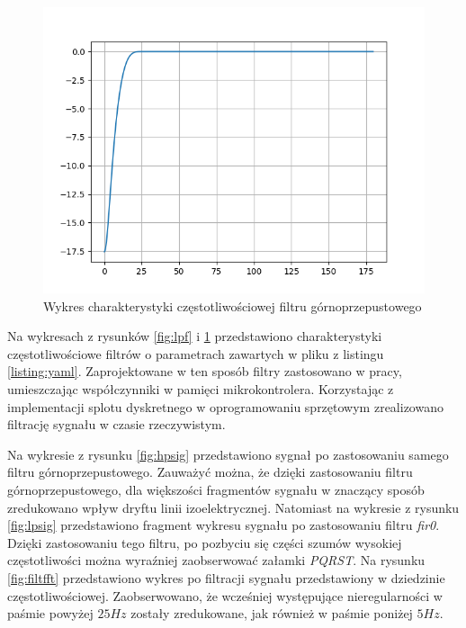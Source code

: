 \begin{figure}[h!]
    \centering 
    \includegraphics[scale=0.5]{pl/media/hpf.png}
    \caption{Wykres charakterystyki częstotliwościowej filtru górnoprzepustowego} 
    \label{fig:hpf}
\end{figure}

Na wykresach z rysunków
\ref{fig:lpf} i \ref{fig:hpf} przedstawiono charakterystyki częstotliwościowe filtrów
o parametrach zawartych w pliku z listingu \ref{listing:yaml}. Zaprojektowane
w ten sposób filtry zastosowano w pracy, umieszczając współczynniki w pamięci mikrokontrolera.
Korzystając z implementacji splotu dyskretnego w oprogramowaniu sprzętowym zrealizowano
filtrację sygnału w czasie rzeczywistym.

Na wykresie z rysunku \ref{fig:hpsig} przedstawiono sygnał po zastosowaniu samego
filtru górnoprzepustowego. Zauważyć można, że dzięki zastosowaniu filtru górnoprzepustowego,
dla większości fragmentów sygnału w znaczący sposób zredukowano wpływ dryftu linii izoelektrycznej.
Natomiast na wykresie z rysunku \ref{fig:lpsig} przedstawiono fragment wykresu sygnału
po zastosowaniu filtru \textit{fir0}. Dzięki zastosowaniu tego filtru, po pozbyciu
się części szumów wysokiej częstotliwości można wyraźniej zaobserwować załamki \textit{PQRST}. 
Na rysunku \ref{fig:filtfft} przedstawiono wykres po filtracji sygnału 
przedstawiony w dziedzinie częstotliwościowej. Zaobserwowano, że wcześniej występujące
nieregularności w paśmie powyżej $25 Hz$ zostały zredukowane, jak również w paśmie
poniżej $5 Hz$.

